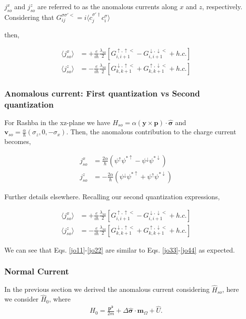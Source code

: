 \documentclass[10pt,prb,showpacs,amssymb,floatfix]{revtex4-1}
\newcommand{\dg}{\dagger}
\newcommand{\dna}{\downarrow}
\newcommand{\upa}{\uparrow}
\newcommand{\alp}{\alpha}
\newcommand{\Dlt}{\Delta}
\newcommand{\Og}{\Omega}
\newcommand{\sg}{\sigma}
\newcommand{\h}{\hat}
\begin{document}
$j_{so}^x$ and $j_{so}^z$ are referred to as the anomalous currents along $x$ and $z$, respectively.
Considering that $G_{ij}^{\sg\sg'<} = i \langle c_j^{\sg'\dg} c_i^\sg \rangle$

then,

\begin{align}
\langle j_{so}^x\rangle &=+\frac{e}{i\hbar}\frac{\lambda_{so}}{2} [ G^{\upa,\upa <}_{i,i+1} - G^{\dna,\dna <}_{i,i+1}    +h.c. ] \\
\langle j_{so}^z \rangle&=-\frac{e}{i\hbar}\frac{\lambda_{so}}{2} [ G^{\dna,\upa <}_{k,k+1} + G^{\upa,\dna <}_{k,k+1} +h.c.]
\end{align}

  \subsubsection{Anomalous current:  First quantization vs Second quantization}


For Rashba in the xz-plane we have $H_{so} = \alp (\bm y \times \bm p)\cdot \bm \hat{\bm \sg}$ and $\bm v_{so} = \frac{\alp}{\hbar}(\sg_z,0, - \sg_x)$. Then, the anomalous contribution to the charge current becomes,

\begin{align}
 \label{jo11}
j^x_{so} &= \frac{2\alp}{\hbar} (\psi^\upa \psi^{*\upa} - \psi^\dna\psi^{*\dna}) \\
j^z_{so} &= -\frac{2\alp}{\hbar} (\psi^\dna\psi^{*\upa} + \psi^\upa\psi^{*\dna})
 \label{jo22}
\end{align}
 
Further details elsewhere. Recalling our second quantization expressions,
 
 \begin{align}
\label{jo33}
\langle j_{so}^x\rangle &=+\frac{e}{i\hbar}\frac{\lambda_{so}}{2} [ G^{\upa,\upa <}_{i,i+1} - G^{\dna,\dna <}_{i,i+1}    +h.c. ] \\
\langle j_{so}^z \rangle&=-\frac{e}{i\hbar}\frac{\lambda_{so}}{2} [ G^{\dna,\upa <}_{k,k+1} + G^{\upa,\dna <}_{k,k+1} +h.c.]
 \label{jo44}
\end{align}

We can see that Eqs. \eqref{jo11}-\eqref{jo22} are similar to Eqs. \eqref{jo33}-\eqref{jo44} as expected.

\subsubsection{Normal Current}
In the previous section we derived the anomalous current considering $\h H_{so}$, here we consider $\h H_0$, where
\begin{align}
H_0 = \frac{\bm{p^2}}{2m} + \Dlt \bm{\h \sg} \cdot \bm m_\Og  + \h U.
\end{align}
\end{document}

